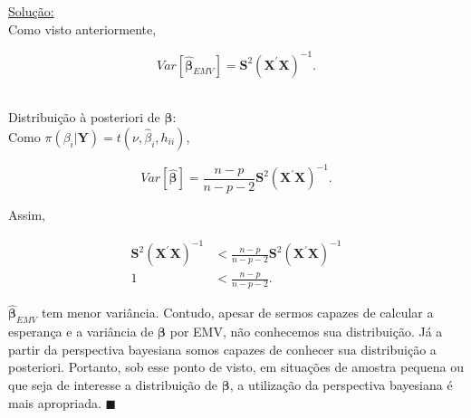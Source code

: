 \documentclass[12pt, oldfontcommands]{article}\usepackage[]{graphicx}\usepackage[]{color}
\newcommand{\horrule}[1]{\rule{\linewidth}{#1}}
\begin{document}
\underline{Solução:} \\

Como visto anteriormente,

\begin{multicols}{2}
 \[ Var[\hat{\bm{\beta}}_{EMV}] =
    \mathbf{S}^{2} (\mathbf{X}^{'} \mathbf{X})^{-1}. \] \\

\columnbreak

Distribuição à posteriori de \(\bm{\beta}\): \\

Como \(\pi(\beta_{i}|\mathbf{Y}) = t(\nu, \hat{\beta}_{i}, h_{ii})\),

\[ Var[\hat{\bm{\beta}}] =
   \frac{n-p}{n-p-2} \mathbf{S}^{2} (\mathbf{X}^{'} \mathbf{X})^{-1}. \]
\end{multicols}

Assim,

\begin{align*}
 \mathbf{S}^{2} (\mathbf{X}^{'} \mathbf{X})^{-1} & <
 \frac{n - p}{n - p - 2} \mathbf{S}^{2} (\mathbf{X}^{'} \mathbf{X})^{-1}
 \\ 1 & < \frac{n - p}{n - p - 2}.
\end{align*}

\(\hat{\bm{\beta}}_{EMV}\) tem menor variância. Contudo, apesar de sermos
capazes de calcular a esperança e a variância de \(\bm{\beta}\) por EMV,
não conhecemos sua distribuição. Já a partir da perspectiva bayesiana
somos capazes de conhecer sua distribuição a posteriori. Portanto, sob
esse ponto de visto, em situações de amostra pequena ou que seja de
interesse a distribuição de \(\bm{\beta}\), a utilização da perspectiva
bayesiana é mais apropriada.
\hfill \(\blacksquare\)



\end{document}

